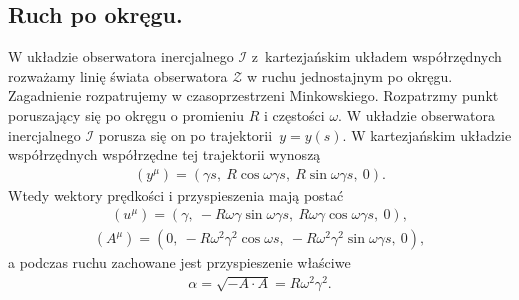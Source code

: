 \subsection{Ruch po okręgu.}
W układzie obserwatora inercjalnego $\mathcal{I}$ z~kartezjańskim 
układem współrzędnych rozważamy linię świata 
obserwatora $\mathcal{Z}$ w ruchu jednostajnym po okręgu.
Zagadnienie rozpatrujemy w czasoprzestrzeni Minkowskiego.
Rozpatrzmy punkt poruszający się po okręgu o promieniu $R$ i 
częstości $\omega$. W układzie
obserwatora inercjalnego $\mathcal{I}$ porusza się on po 
trajektorii~$y=y(s)$. W kartezjańskim układzie współrzędnych
współrzędne tej trajektorii wynoszą 
\begin{align*}
(y^\mu) = (\gamma s,\ R\cos\omega\gamma s,\ R\sin\omega\gamma s,\ 0).
\end{align*}
Wtedy wektory prędkości i przyspieszenia mają postać
\begin{align*}
(u^\mu) %
= (\gamma,\ -R\omega\gamma\sin\omega\gamma s,
\ R\omega\gamma\cos\omega\gamma s,\ 0),
\end{align*}
\begin{align*}
(A^\mu) %
= (0,\ -R\omega^2\gamma^2\cos\omega s
,\ -R\omega^2\gamma^2\sin\omega\gamma s,\ 0),
\end{align*}
a podczas ruchu zachowane jest przyspieszenie właściwe 
\begin{align*}
\alpha =\sqrt{ - A\cdot A} =  R\omega^2\gamma^2 .
\end{align*}

